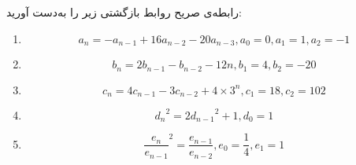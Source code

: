 \EXERCISE
رابطه‌ی صریح روابط بازگشتی زیر را به‌دست آورید:
\begin{enumerate}
\item
$$a_n = -a_{n-1} + 16a_{n-2} - 20a_{n-3}, a_0 = 0, a_1 = 1, a_2 = -1$$
\item
$$b_n = 2b_{n-1} - b_{n-2} - 12n, b_1 = 4, b_2 = -20$$
\item
$$c_n = 4c_{n-1} - 3c_{n-2} + 4 \times 3^n, c_1 = 18, c_2 = 102$$
\item
$${d_n}^2 = 2{d_{n-1}}^2 + 1, d_0 = 1$$
\item
$${\frac{e_n}{e_{n-1}}}^2 = \frac{e_{n-1}}{e_{n-2}}, e_0 = \frac{1}{4}, e_1 = 1$$
\end{enumerate}